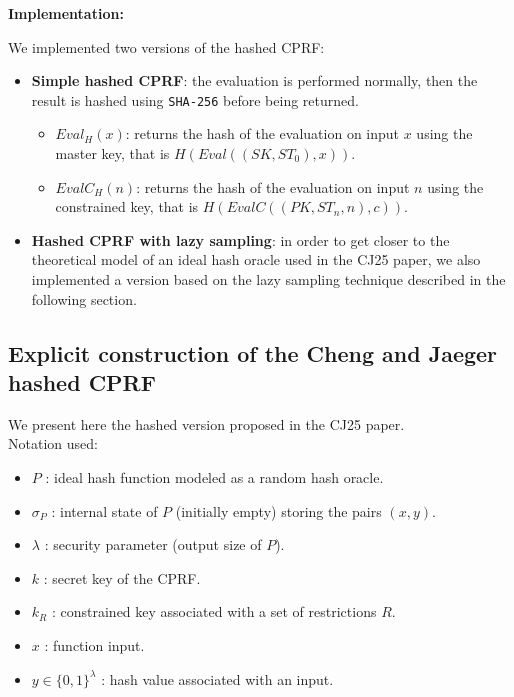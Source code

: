 \documentclass[9pt]{extarticle}
\begin{document}
\textbf{Implementation:}

We implemented two versions of the hashed CPRF:

\begin{itemize}
  \item \textbf{Simple hashed CPRF}: the evaluation is performed normally,
  then the result is hashed using \texttt{SHA-256} before being returned.
    \begin{itemize}
      \item \texttt{$Eval_H(x)$}: returns the hash of the evaluation on input $x$ using the master key, that is $H(Eval((SK, ST_0), x))$.
      \item \texttt{$EvalC_H(n)$}: returns the hash of the evaluation on input $n$ using the constrained key, that is $H(EvalC((PK, ST_n, n), c))$.\\
    \end{itemize}

  \item \textbf{Hashed CPRF with lazy sampling}: in order to get closer to the
  theoretical model of an ideal hash oracle used in the CJ25 paper, we also implemented
  a version based on the lazy sampling technique described in the following section.
\end{itemize}

\newpage
\subsection{Explicit construction of the Cheng and Jaeger hashed CPRF}

We present here the hashed version proposed in the CJ25 paper.\\

Notation used:
\begin{itemize}
  \item $P$ : ideal hash function modeled as a random hash oracle.
  \item $\sigma_P$ : internal state of $P$ (initially empty) storing the pairs $(x,y)$.
  \item $\lambda$ : security parameter (output size of $P$).
  \item $k$ : secret key of the \textsf{CPRF}.
  \item $k_R$ : constrained key associated with a set of restrictions $R$.
  \item $x$ : function input.
  \item $y \in \{0,1\}^{\lambda}$ : hash value associated with an input.
\end{itemize}
\end{document}
